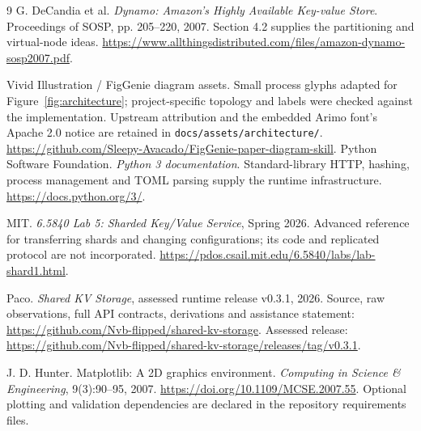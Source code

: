 \documentclass[12pt,a4paper]{article}
\newcommand{\repo}{\url{https://github.com/Nvb-flipped/shared-kv-storage}}
\begin{document}
\newpage
\begin{thebibliography}{9}
\setlength{\itemsep}{8pt}
G. DeCandia et al. \emph{Dynamo: Amazon's Highly Available Key-value Store}.
Proceedings of SOSP, pp. 205--220, 2007. Section 4.2 supplies the partitioning and
virtual-node ideas. \url{https://www.allthingsdistributed.com/files/amazon-dynamo-sosp2007.pdf}.

Vivid Illustration / FigGenie diagram assets. Small process glyphs adapted for
Figure~\ref{fig:architecture}; project-specific topology and labels were checked
against the implementation. Upstream attribution and the embedded Arimo font's
Apache 2.0 notice are retained in \texttt{docs/assets/architecture/}.
\url{https://github.com/Sleepy-Avacado/FigGenie-paper-diagram-skill}.
Python Software Foundation. \emph{Python 3 documentation}.
Standard-library HTTP, hashing, process management and TOML parsing supply the
runtime infrastructure. \url{https://docs.python.org/3/}.

MIT. \emph{6.5840 Lab 5: Sharded Key/Value Service}, Spring 2026.
Advanced reference for transferring shards and changing configurations;
its code and replicated protocol are not incorporated.
\url{https://pdos.csail.mit.edu/6.5840/labs/lab-shard1.html}.

Paco. \emph{Shared KV Storage}, assessed runtime release v0.3.1, 2026.
Source, raw observations, full API contracts, derivations and assistance statement:
\repo. Assessed release:
\url{https://github.com/Nvb-flipped/shared-kv-storage/releases/tag/v0.3.1}.

J. D. Hunter. Matplotlib: A 2D graphics environment.
\emph{Computing in Science \& Engineering}, 9(3):90--95, 2007.
\url{https://doi.org/10.1109/MCSE.2007.55}. Optional plotting and validation
dependencies are declared in the repository requirements files.

\end{thebibliography}
\end{document}
